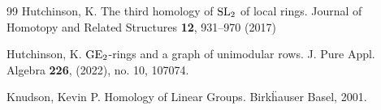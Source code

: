 \documentclass[11pt]{amsart}
\theoremstyle{definition}
\theoremstyle{plain}
\numberwithin{equation}{section}
\newcommand{\q}{\mathbb{Q}}
\newcommand{\GE}{{\rm GE}}
\newcommand{\SL}{\mathit{{\rm SL}}}
\begin{document}
\begin{thebibliography}{99}
Hutchinson, K. The third homology of $\SL_2$ of local rings. Journal of Homotopy and Related Structures {\bf 12}, 931--970 (2017)

Hutchinson, K. $\GE_2$-rings and a graph of unimodular rows. J. Pure Appl. Algebra {\bf 226}, (2022), no. 10, 107074.

Knudson, Kevin P. Homology of Linear Groups. Birk\"hauser Basel, 2001.















\end{thebibliography}
\end{document}
